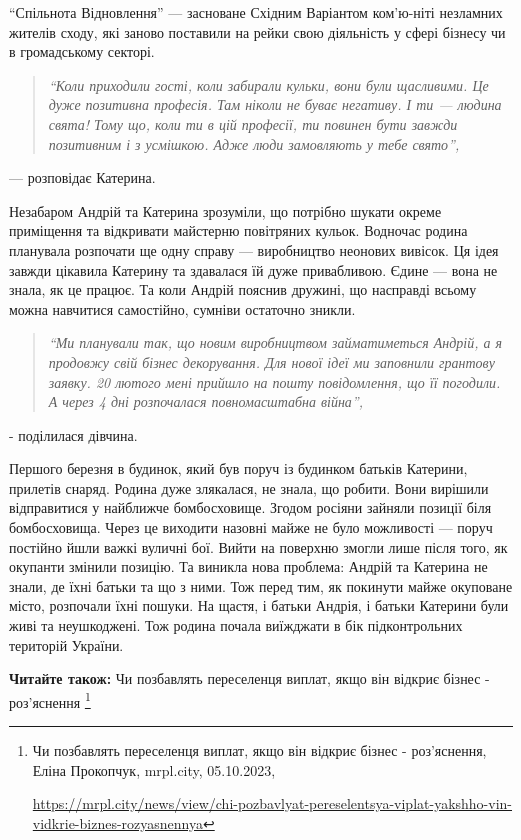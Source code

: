 \enquote{Спільнота Відновлення} — засноване Східним Варіантом ком'ю\hyp{}ніті незламних
жителів сходу, які заново поставили на рейки свою діяльність у сфері бізнесу чи
в громадському секторі.


\begin{quote}
\em\enquote{Коли приходили гості, коли забирали кульки, вони були щасливими. Це дуже
позитивна професія. Там ніколи не буває негативу. І ти — людина свята! Тому що,
коли ти в цій професії, ти повинен бути завжди позитивним і з усмішкою. Адже
люди замовляють у тебе свято}, 
\end{quote}
— розповідає Катерина.

Незабаром Андрій та Катерина зрозуміли, що потрібно шукати окреме приміщення та
відкривати майстерню повітряних кульок. Водночас родина планувала розпочати ще
одну справу — виробництво неонових вивісок. Ця ідея завжди цікавила Катерину та
здавалася їй дуже привабливою. Єдине — вона не знала, як це працює. Та коли
Андрій пояснив дружині, що насправді всьому можна навчитися самостійно, сумніви
остаточно зникли.


\begin{quote}
\em\enquote{Ми планували так, що новим виробництвом займатиметься Андрій, а я продовжу
свій бізнес декорування. Для нової ідеї ми заповнили грантову заявку. 20 лютого
мені прийшло на пошту повідомлення, що її погодили. А через 4 дні розпочалася
повномасштабна війна},
\end{quote}

- поділилася дівчина.

Першого березня в будинок, який був поруч із будинком батьків Катерини,
прилетів снаряд. Родина дуже злякалася, не знала, що робити. Вони вирішили
відправитися у найближче бомбосховище. Згодом росіяни зайняли позиції біля
бомбосховища. Через це виходити назовні майже не було можливості — поруч
постійно йшли важкі вуличні бої. Вийти на поверхню змогли лише після того, як
окупанти змінили позицію. Та виникла нова проблема: Андрій та Катерина не
знали, де їхні батьки та що з ними. Тож перед тим, як покинути майже окуповане
місто, розпочали їхні пошуки. На щастя, і батьки Андрія, і батьки Катерини були
живі та неушкоджені. Тож родина почала виїжджати в бік підконтрольних територій
України.

\textbf{Читайте також:} Чи позбавлять переселенця виплат, якщо він відкриє бізнес - роз'яснення
\footnote{Чи позбавлять переселенця виплат, якщо він відкриє бізнес - роз'яснення, Еліна Прокопчук, mrpl.city, 05.10.2023, \par%
\url{https://mrpl.city/news/view/chi-pozbavlyat-pereselentsya-viplat-yakshho-vin-vidkrie-biznes-rozyasnennya}
}

